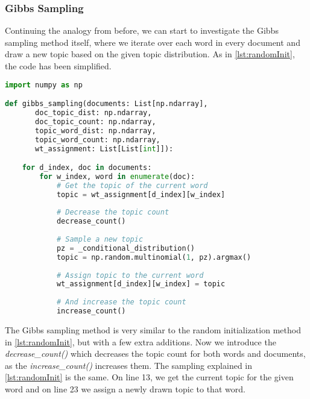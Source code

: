 \subsubsection{Gibbs Sampling}
Continuing the analogy from before, we can start to investigate the Gibbs sampling method itself, where we iterate over each word in every document and draw a new topic based on the given topic distribution.
As in \autoref{lst:randomInit}, the code has been simplified.
\begin{lstlisting}[language=Python, caption=Gibbs Sampling Method,label={lst:gibbsSampling}, float, floatplacement=H]
import numpy as np

def gibbs_sampling(documents: List[np.ndarray],
	   doc_topic_dist: np.ndarray,
	   doc_topic_count: np.ndarray,
	   topic_word_dist: np.ndarray,
	   topic_word_count: np.ndarray,
	   wt_assignment: List[List[int]]):

	for d_index, doc in documents:
		for w_index, word in enumerate(doc):
			# Get the topic of the current word
			topic = wt_assignment[d_index][w_index]
			
			# Decrease the topic count
			decrease_count()
			
			# Sample a new topic
			pz = _conditional_distribution()
			topic = np.random.multinomial(1, pz).argmax()
			
			# Assign topic to the current word
			wt_assignment[d_index][w_index] = topic
			
			# And increase the topic count
			increase_count()
\end{lstlisting}
The Gibbs sampling method is very similar to the random initialization method in \autoref{lst:randomInit}, but with a few extra additions. 
Now we introduce the \emph{decrease\_count()} which decreases the topic count for both words and documents, as the \emph{increase\_count()} increases them.
The sampling explained in \autoref{lst:randomInit} is the same.
On line 13, we get the current topic for the given word and on line 23 we assign a newly drawn topic to that word.
